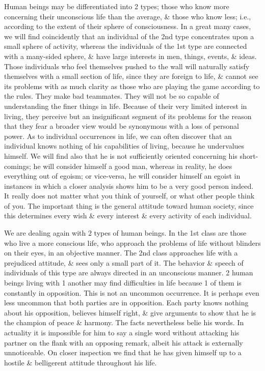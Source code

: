 \documentclass{article}
\begin{document}
Human beings may be differentiated into 2 types; those who know more concerning their unconscious life than the average, \& those who know less; i.e., according to the extent of their sphere of consciousness. In a great many cases, we will find coincidently that an individual of the 2nd type concentrates upon a small sphere of activity, whereas the individuals of the 1st type are connected with a many-sided sphere, \& have large interests in men, things, events, \& ideas. Those individuals who feel themselves pushed to the wall will naturally satisfy themselves with a small section of life, since they are foreign to life, \& cannot see its problems with as much clarity as those who are playing the game according to the rules. They make bad teammates. They will not be so capable of understanding the finer things in life. Because of their very limited interest in living, they perceive but an insignificant segment of its problems for the reason that they fear a broader view would be synonymous with a loss of personal power. As to individual occurrences in life, we can often discover that an individual knows nothing of his capabilities of living, because he undervalues himself. We will find also that he is not sufficiently oriented concerning his short-comings; he will consider himself a good man, whereas in reality, he does everything out of egoism; or vice-versa, he will consider himself an egoist in instances in which a closer analysis shows him to be a very good person indeed. It really does not matter what you think of yourself, or what other people think of you. The important thing is the general attitude toward human society, since this determines every wish \& every interest \& every activity of each individual.

We are dealing again with 2 types of human beings. In the 1st class are those who live a more conscious life, who approach the problems of life without blinders on their eyes, in an objective manner. The 2nd class approaches life with a prejudiced attitude, \& sees only a small part of it. The behavior \& speech of individuals of this type are always directed in an unconscious manner. 2 human beings living with 1 another may find difficulties in life because 1 of them is constantly in opposition. This is not an uncommon occurrence. It is perhaps even less uncommon that both parties are in opposition. Each party knows nothing about his opposition, believes himself right, \& give arguments to show that he is the champion of peace \& harmony. The facts nevertheless belie his words. In actuality it is impossible for him to say a single word without attacking his partner on the flank with an opposing remark, albeit his attack is externally unnoticeable. On closer inspection we find that he has given himself up to a hostile \& belligerent attitude throughout his life.
\end{document}

